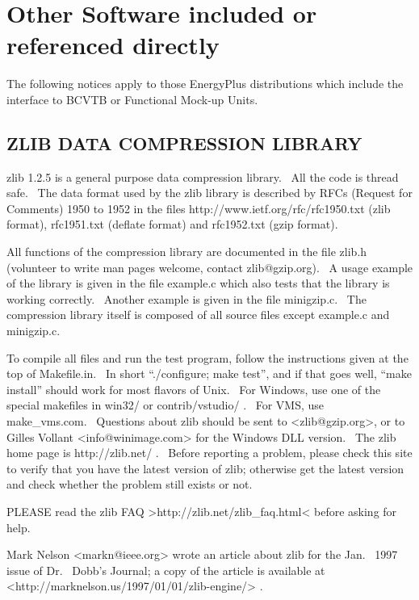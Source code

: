 \section{Other Software included or referenced directly}\label{other-software-included-or-referenced-directly}

The following notices apply to those EnergyPlus distributions which include the interface to BCVTB or Functional Mock-up Units.

\subsection{ZLIB DATA COMPRESSION LIBRARY}\label{zlib-data-compression-library}

zlib 1.2.5 is a general purpose data compression library.~ All the code is thread safe.~ The data format used by the zlib library is described by RFCs (Request for Comments) 1950 to 1952 in the files http://www.ietf.org/rfc/rfc1950.txt (zlib format), rfc1951.txt (deflate format) and rfc1952.txt (gzip format).

All functions of the compression library are documented in the file zlib.h (volunteer to write man pages welcome, contact zlib@gzip.org).~ A usage example of the library is given in the file example.c which also tests that the library is working correctly. ~Another example is given in the file minigzip.c.~ The compression library itself is composed of all source files except example.c and minigzip.c.

To compile all files and run the test program, follow the instructions given at the top of Makefile.in.~ In short ``./configure; make test'', and if that goes well, ``make install'' should work for most flavors of Unix.~ For Windows, use one of the special makefiles in win32/ or contrib/vstudio/ .~ For VMS, use make\_vms.com.~ Questions about zlib should be sent to \textless{}zlib@gzip.org\textgreater{}, or to Gilles Vollant \textless{}info@winimage.com\textgreater{} for the Windows DLL version.~ The zlib home page is http://zlib.net/ .~ Before reporting a problem, please check this site to verify that you have the latest version of zlib; otherwise get the latest version and check whether the problem still exists or not.

PLEASE read the zlib FAQ \textgreater{}http://zlib.net/zlib\_faq.html\textless{} before asking for help.

Mark Nelson \textless{}markn@ieee.org\textgreater{} wrote an article about zlib for the Jan.~ 1997 issue of Dr.~ Dobb's Journal; a copy of the article is available at \textless{}http://marknelson.us/1997/01/01/zlib-engine/\textgreater{} .

